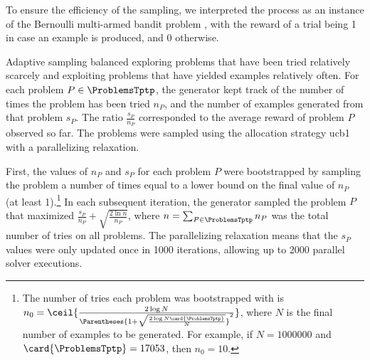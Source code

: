 To ensure the efficiency of the sampling, we interpreted the process as an instance of the Bernoulli multi-armed bandit problem \cite{Sutton1998},
with the reward of a trial being 1 in case an example is produced, and 0 otherwise.

Adaptive sampling balanced
exploring problems that have been tried relatively scarcely and
exploiting problems that have yielded examples relatively often.
For each problem $P \in \ProblemsTptp$,
the generator kept track of the number of times the problem has been tried $n_P$,
and the number of examples generated from that problem $s_P$.
The ratio $\frac{s_P}{n_P}$ corresponded to the average reward of problem $P$ observed so far.
The problems were sampled using the allocation strategy \acrshort{ucb1} \cite{Auer2002} with a parallelizing relaxation.

First, the values of $n_P$ and $s_P$ for each problem $P$ were bootstrapped by sampling the problem a number of times equal to a lower bound on the final value of $n_P$ (at least 1).\footnote{The number of tries each problem was bootstrapped with is
$n_0 = \ceil{\frac{2 \log{N}}{\Parentheses{1 + \sqrt{\frac{2 \log{N} \card{\ProblemsTptp}}{N}}}^2}}$,
where $N$ is the final number of examples to be generated.
For example, if $N=1000000$ and $\card{\ProblemsTptp}=17053$, then $n_0 = 10$.}
In each subsequent iteration, the generator sampled the problem $P$ that maximized
$\frac{s_P}{n_P} + \sqrt{\frac{2 \ln n}{n_P}}$,
where $n = \sum_{P \in \ProblemsTptp} n_P$ was the total number of tries on all problems.
The parallelizing relaxation means that the $s_P$ values were only updated once in \num{1000} iterations,
allowing up to \num{2000} parallel solver executions.

